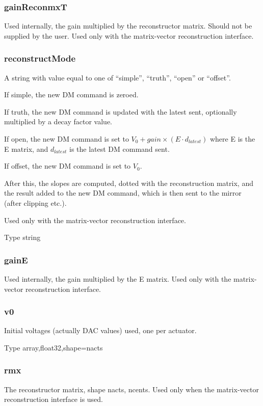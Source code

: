 \documentclass[a4,10pt]{article}
\begin{document}
\subsubsection{gainReconmxT}
Used internally, the gain multiplied by the reconstructor matrix.
Should not be supplied by the user.  Used only with the matrix-vector
reconstruction interface.

\subsubsection{reconstructMode}
A string with value equal to one of ``simple'', ``truth'', ``open'' or
``offset''.  

If simple, the new DM command is zeroed.  

If truth, the new DM command is updated with the latest sent,
optionally multiplied by a decay factor value.

If open, the new DM command is set to $V_0 + gain \times (E \cdot
d_{latest})$ where E is the E matrix, and $d_{latest}$ is the latest DM
command sent.

If offset, the new DM command is set to $V_0$.

After this, the slopes are computed, dotted with the reconstruction
matrix, and the result added to the new DM command, which is then sent
to the mirror (after clipping etc.).

Used only with the matrix-vector
reconstruction interface.

Type string

\subsubsection{gainE}
Used internally, the gain multiplied by the E matrix.  Used only with the matrix-vector
reconstruction interface.

\subsubsection{v0}
Initial voltages (actually DAC values) used, one per actuator.

Type array,float32,shape=nacts

\subsubsection{rmx}
The reconstructor matrix, shape nacts, ncents.  Used only when the
matrix-vector reconstruction interface is used.
\end{document}
